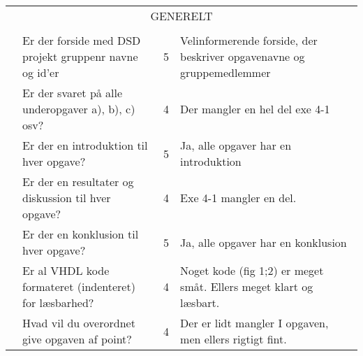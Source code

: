 \begin{table}[h]
    \small
    \begin{tabularx}{\textwidth}{p{3.5cm}Xp{5mm}X} &                                                        &                                                                           \\\midrule
        \multicolumn{4}{c}{GENERELT}                                                                                                                                        \\\midrule
                                       &                                                        &   &                                                                       \\
                                       & Er der forside med DSD projekt gruppenr navne og id'er & 5 & Velinformerende forside, der beskriver opgavenavne og gruppemedlemmer \\
                                       & Er der svaret på alle underopgaver a), b), c) osv?     & 4 & Der mangler en hel del exe 4-1                                        \\
                                       & Er der en introduktion til hver opgave?                & 5 & Ja, alle opgaver har en introduktion                                  \\
                                       & Er der en resultater og diskussion til hver opgave?    & 4 & Exe 4-1 mangler en del.                                               \\
                                       & Er der en konklusion til hver opgave?                  & 5 & Ja, alle opgaver har en konklusion                                    \\
                                       & Er al VHDL kode formateret (indenteret) for læsbarhed? & 4 & Noget kode (fig 1;2) er meget småt. Ellers meget klart og læsbart.    \\
                                       & Hvad vil du overordnet give opgaven af point?          & 4 & Der er lidt mangler I opgaven, men ellers rigtigt fint.               \\ \bottomrule
    \end{tabularx}
\end{table}